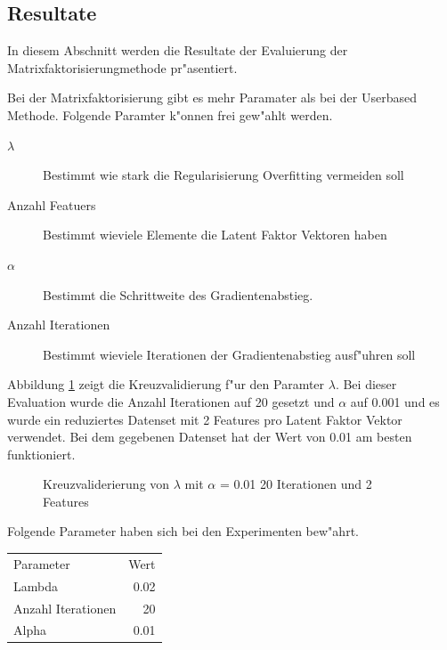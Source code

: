 \documentclass[a4paper, 12pt]{article}
\begin{document}
\subsection{Resultate}
\label{sec:results}

In diesem Abschnitt werden die Resultate der Evaluierung der Matrixfaktorisierungmethode pr"asentiert.

Bei der Matrixfaktorisierung gibt es mehr Paramater als bei der Userbased Methode. Folgende Paramter k"onnen frei gew"ahlt werden.

\begin{description}
\item[$\lambda$] Bestimmt wie stark die Regularisierung Overfitting vermeiden soll
\item[Anzahl Featuers] Bestimmt wieviele Elemente die Latent Faktor Vektoren haben
\item[$\alpha$] Bestimmt die Schrittweite des Gradientenabstieg.
\item[Anzahl Iterationen] Bestimmt wieviele Iterationen der Gradientenabstieg ausf"uhren soll
\end{description}

Abbildung \ref{fig:lambda} zeigt die Kreuzvalidierung f"ur den Paramter $\lambda$. Bei dieser Evaluation wurde die Anzahl Iterationen auf 20 gesetzt und $\alpha$ auf 0.001 und es wurde ein reduziertes Datenset mit 2 Features pro Latent Faktor Vektor verwendet.
Bei dem gegebenen Datenset hat der Wert von 0.01 am besten funktioniert.

\begin{figure}
  \centering
{}
\label{fig:lambda}
\caption{Kreuzvaliderierung von $\lambda$ mit $\alpha$ = 0.01 20 Iterationen und 2 Features}
\end{figure}

Folgende Parameter haben sich bei den Experimenten bew"ahrt.

\begin{center}
\begin{tabular}{lr}
 Parameter           &  Wert  \\
 Lambda              &  0.02  \\
 Anzahl Iterationen  &    20  \\
 Alpha               &  0.01  \\
\end{tabular}
\end{center}
\end{document}
